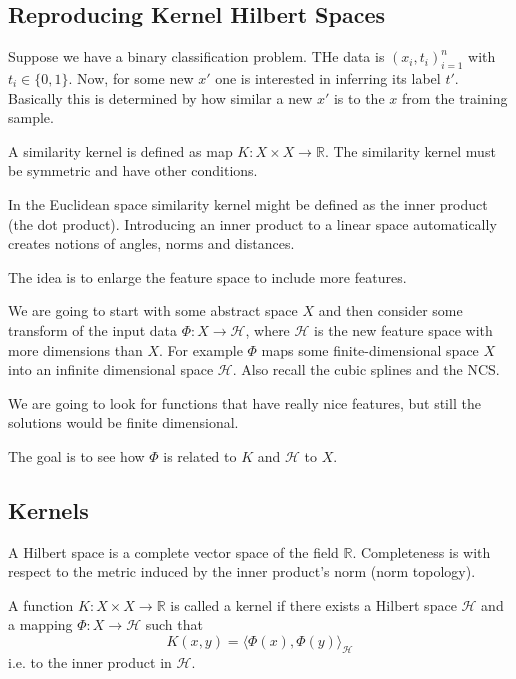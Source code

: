 \documentclass[a4paper]{article}
\newcommand{\Real}{\mathbb{R}}
\newcommand{\Hcal}{\mathcal{H}}
\begin{document}
\subsection{Reproducing Kernel Hilbert Spaces} %
\label{sub:reproducing_kernel_hilbert_spaces}

Suppose we have a binary classification problem. THe data is $(x_i, t_i)_{i=1}^n$
with $t_i\in \{0,1\}$. Now, for some new $x'$ one is interested in inferring its label $t'$.
Basically this is determined by how similar a new $x'$ is to the $x$ from the training
sample.

A similarity kernel is defined as map $K:X\times X\to \Real$. The similarity kernel
must be symmetric and have other conditions.

In the Euclidean space similarity kernel might be defined as the inner product
(the dot product). Introducing an inner product to a linear space automatically
creates notions of angles, norms and distances.

The idea is to enlarge the feature space to include more features.

We are going to start with some abstract space $X$ and then consider some transform of
the input data $\Phi:X\to \Hcal$, where $\Hcal$ is the new feature space with more
dimensions than $X$. For example $\Phi$ maps some finite-dimensional space $X$ into
an infinite dimensional space $\Hcal$. Also recall the cubic splines and the NCS.

We are going to look for functions that have really nice features, but still the
solutions would be finite dimensional.

The goal is to see how $\Phi$ is related to $K$ and $\Hcal$ to $X$.


\subsection{Kernels} %
\label{sub:kernels}

A Hilbert space is a complete vector space of the field $\Real$. Completeness is
with respect to the metric induced by the inner product's norm (norm topology).

A function $K:X\times X\to\Real$ is called a kernel if there exists a Hilbert space
$\Hcal$ and a mapping $\Phi:X\to\Hcal$ such that
\[ K(x,y) = \bigl\langle \Phi(x), \Phi(y) \bigr\rangle_\Hcal \]
i.e. to the inner product in $\Hcal$.
\end{document}
